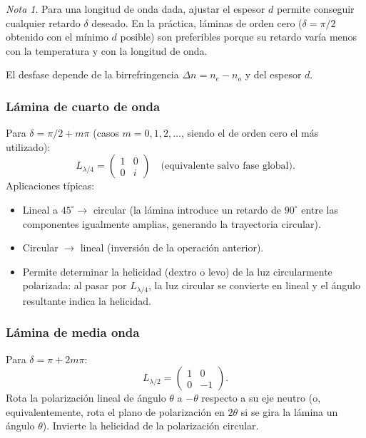 \documentclass[12pt, a4paper]{article}
\theoremstyle{plain}
\theoremstyle{definition}
\theoremstyle{remark}
\newtheorem*{nota}{Nota}
\begin{document}
\begin{nota}
Para una longitud de onda dada, ajustar el espesor $d$ permite conseguir
cualquier retardo $\delta$ deseado. En la práctica, láminas de orden cero
($\delta = \pi/2$ obtenido con el mínimo $d$ posible) son preferibles porque
su retardo varía menos con la temperatura y con la longitud de onda.
\end{nota}

El desfase depende de la birrefringencia $\Delta n=n_e-n_o$ y del espesor $d$.

\subsubsection{Lámina de cuarto de onda}

Para $\delta=\pi/2 + m\pi$ (casos $m = 0, 1, 2, \ldots$, siendo el de
orden cero el más utilizado):
\[
  L_{\lambda/4}
  =
  \begin{pmatrix}
    1 & 0\\
    0 & i
  \end{pmatrix}
  \quad\text{(equivalente salvo fase global).}
\]
Aplicaciones típicas:
\begin{itemize}
  \item Lineal a $45^\circ \to$ circular (la lámina introduce un retardo
        de $90^\circ$ entre las componentes igualmente amplias, generando
        la trayectoria circular).
  \item Circular $\to$ lineal (inversión de la operación anterior).
  \item Permite determinar la helicidad (dextro o levo) de la luz
        circularmente polarizada: al pasar por $L_{\lambda/4}$, la luz
        circular se convierte en lineal y el ángulo resultante indica la
        helicidad.
\end{itemize}

\subsubsection{Lámina de media onda}

Para $\delta=\pi + 2m\pi$:
\[
  L_{\lambda/2}
  =
  \begin{pmatrix}
    1 & 0\\
    0 & -1
  \end{pmatrix}.
\]
Rota la polarización lineal de ángulo $\theta$ a $-\theta$ respecto a su
eje neutro (o, equivalentemente, rota el plano de polarización en $2\theta$
si se gira la lámina un ángulo $\theta$). Invierte la helicidad de la
polarización circular.
\end{document}
